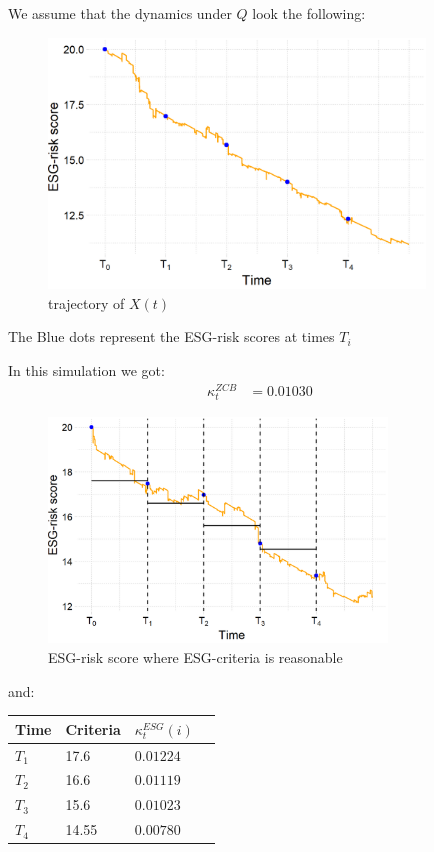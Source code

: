 We assume that the dynamics under $Q$ look the following: 
\begin{figure}[htp]
    \centering
    \includegraphics[width=10cm]{figures/ESG/ESG_OU_path.png}
    \caption{trajectory of $X(t)$}
    \label{fig: ESG-risk score}
\end{figure}

The Blue dots represent the ESG-risk scores at times $T_{i}$

\newpage 

In this simulation we got: 
\begin{align*}
\kappa_{t}^{ZCB} &= 0.01030    
\end{align*}

\begin{figure}[htp]
    \centering
    \includegraphics[width= 9cm]{figures/ESG/ESG_plt_criteria.png}
    \caption{ESG-risk score where ESG-criteria is reasonable}
    \label{fig: ESG-risk_criteria1}
\end{figure}

and: 
\begin{center}
    \begin{tabular}{ | l | l | l | p{5cm} |}
    \hline
    Time    &   Criteria  & $\kappa_{t}^{ESG}(i)$ \\ \hline
    $T_{1}$ &      17.6   & $0.01224$  \\ \hline
    $T_{2}$ &      16.6   & $0.01119$  \\ \hline
    $T_{3}$ &      15.6   & $0.01023$  \\ \hline
    $T_{4}$ &      14.55  & $0.00780$   \\ \hline
    \end{tabular}
\end{center} 

